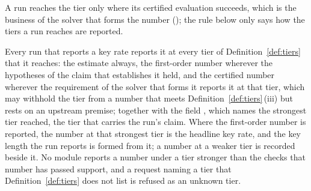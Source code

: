 
A run reaches the  tier only where its certified evaluation
succeeds, which is the business of the solver that forms the number
(); the rule below only
says how the tiers a run reaches are reported.

\begin{requirement}\label{req:tiers}
Every run that reports a key rate reports it at every tier of
Definition~\ref{def:tiers} that it reaches: the estimate always, the
first-order number wherever the hypotheses of the claim that establishes it
held, and the certified number wherever the requirement of the solver that
forms it reports it at that tier, which may withhold the tier from a number
that meets Definition~\ref{def:tiers}\,(iii) but rests on an upstream
premise; together with the field
, which names the strongest tier reached, the tier that
carries the run's claim. Where the first-order number is reported, the number
at that strongest tier is the headline key rate, and the key length the run
reports is formed from it; a number at a weaker tier is recorded beside it.
No module reports a number under a tier stronger than the checks that number
has passed support, and a request naming a tier that
Definition~\ref{def:tiers} does not list is refused as an unknown tier.
\end{requirement}
